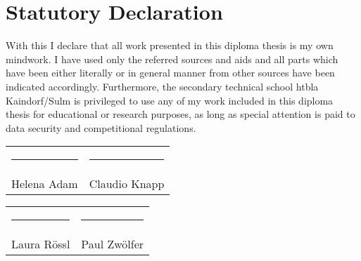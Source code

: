 \chapter*{Statutory Declaration}
With this I declare that all work presented in this diploma thesis is my own mindwork. I have used only the referred sources and aids and all parts which have been either literally or in general manner from other sources have been indicated accordingly.
\newline \newline
Furthermore, the secondary technical school \gls{htbla} Kaindorf/Sulm is privileged to use any of my work included in this diploma thesis for educational or research purposes, as long as special attention is paid to data security and competitional regulations.
\par\bigskip

\par\bigskip

\par\bigskip

\par\bigskip

\par\bigskip

\par\bigskip

\par\bigskip

\par\bigskip

\par\bigskip

\par\bigskip

\par\bigskip

\par\bigskip

\begin{tabular}{p{7cm}p{7cm}}
\rule{6cm}{0.4pt} & \rule{6cm}{0.4pt}\\
Helena Adam & Claudio Knapp
\end{tabular}

\par\bigskip

\par\bigskip

\par\bigskip

\par\bigskip

\begin{tabular}{p{7cm}p{7cm}}
\rule{6cm}{0.4pt} & \rule{6cm}{0.4pt}\\
Laura Rössl & Paul Zwölfer
\end{tabular}


